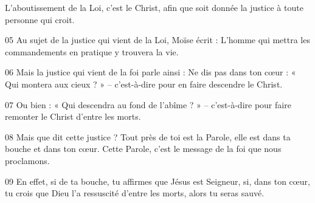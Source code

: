 L’aboutissement de la Loi, c’est le Christ, afin que soit donnée la justice à toute personne qui croit.

05 Au sujet de la justice qui vient de la Loi, Moïse écrit : L’homme qui mettra les commandements en pratique y trouvera la vie.

06 Mais la justice qui vient de la foi parle ainsi : Ne dis pas dans ton cœur : « Qui montera aux cieux ? » – c’est-à-dire pour en faire descendre le Christ.

07 Ou bien : « Qui descendra au fond de l’abîme ? » – c’est-à-dire pour faire remonter le Christ d’entre les morts.

08 Mais que dit cette justice ? Tout près de toi est la Parole, elle est dans ta bouche et dans ton cœur. Cette Parole, c’est le message de la foi que nous proclamons.

09 En effet, si de ta bouche, tu affirmes que Jésus est Seigneur, si, dans ton cœur, tu crois que Dieu l’a ressuscité d’entre les morts, alors tu seras sauvé.
